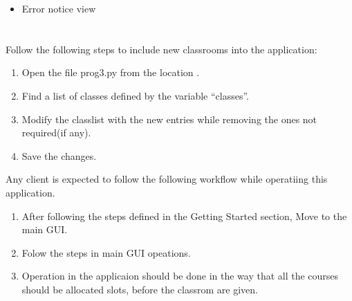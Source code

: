 \documentclass[letterpaper,10pt,english]{sphinxmanual}
\begin{document}
\begin{itemize}
\item {} 
Error notice view

\end{itemize}



\section{}
\label{\detokenize{user_manual:faqs}}

Follow the following steps to include new classrooms into the application:
\begin{enumerate}
%
\item {} 
Open the file prog3.py from the location .

\item {} 
Find a list of classes defined by the variable “classes”.

\item {} 
Modify the classlist with the new entries while removing the ones not required(if any).

\item {} 
Save the changes.

\end{enumerate}


Any client is expected to follow the following workflow while operatiing this application.
\begin{enumerate}
%
\item {} 
After following the steps defined in the Getting Started section, Move to the main GUI.

\item {} 
Folow the steps in main GUI opeations.

\item {} 
Operation in the applicaion should be done in the way that all the courses should be allocated slots, before the classrom are given.

\end{enumerate}
\end{document}
